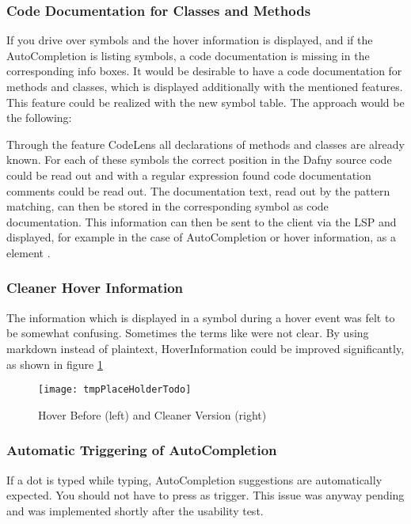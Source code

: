 \subsubsection{Code Documentation for Classes and Methods}
If you drive over symbols and the hover information is displayed,
and if the AutoCompletion is listing symbols,
a code documentation is missing in the corresponding info boxes.
It would be desirable to have a code documentation for methods and classes,
which is displayed additionally with the mentioned features. \\

This feature could be realized with the new symbol table. The approach would be the following:

Through the feature CodeLens all declarations of methods and classes are already known.
For each of these symbols the correct position in the Dafny source code could be read out
and with a regular expression found code documentation comments could be read out.
The documentation text, read out by the pattern matching, can then be stored in the corresponding symbol as code documentation.
This information can then be sent to the client via the LSP and displayed,
for example in the case of AutoCompletion or hover information,
as a  element \cite{vscodeAPI}.

\subsubsection{Cleaner Hover Information}
The information which is displayed in a symbol during a hover event was felt to be somewhat confusing.
Sometimes the terms like  were not clear.
By using markdown instead of plaintext, HoverInformation could be improved significantly, as shown in figure \ref{fig:hoverNowVsThen}\\

\begin{figure}[H]
    \centering
    \texttt{[image: tmpPlaceHolderTodo]}
    \caption{Hover Before (left) and Cleaner Version (right)}
    \label{fig:hoverNowVsThen}
\end{figure}

\subsubsection{Automatic Triggering of AutoCompletion}
If a dot is typed while typing, AutoCompletion suggestions are automatically expected.
You should not have to press  as trigger.
This issue was anyway pending and was implemented shortly after the usability test.

